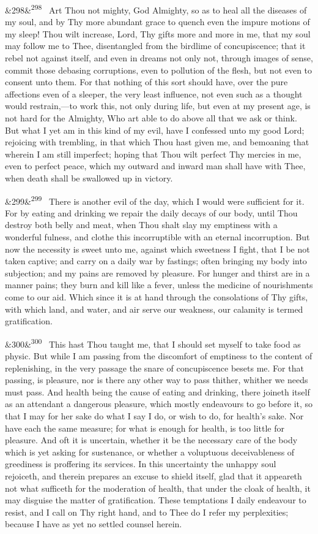 \documentclass[12pt]{article}
\newcommand{\para}[1][]{\par\noindent\ifx&#1&\else\textsuperscript{\footnotesize #1}~\fi}
\begin{document}
\para[298] Art Thou not mighty, God Almighty, so as to heal all the diseases of my soul, and by Thy more abundant grace to quench even the impure motions of my sleep! Thou wilt increase, Lord, Thy gifts more and more in me, that my soul may follow me to Thee, disentangled from the birdlime of concupiscence; that it rebel not against itself, and even in dreams not only not, through images of sense, commit those debasing corruptions, even to pollution of the flesh, but not even to consent unto them. For that nothing of this sort should have, over the pure affections even of a sleeper, the very least influence, not even such as a thought would restrain,---to work this, not only during life, but even at my present age, is not hard for the Almighty, Who art able to do above all that we ask or think. But what I yet am in this kind of my evil, have I confessed unto my good Lord; rejoicing with trembling, in that which Thou hast given me, and bemoaning that wherein I am still imperfect; hoping that Thou wilt perfect Thy mercies in me, even to perfect peace, which my outward and inward man shall have with Thee, when death shall be swallowed up in victory.

\para[299] There is another evil of the day, which I would were sufficient for it. For by eating and drinking we repair the daily decays of our body, until Thou destroy both belly and meat, when Thou shalt slay my emptiness with a wonderful fulness, and clothe this incorruptible with an eternal incorruption. But now the necessity is sweet unto me, against which sweetness I fight, that I be not taken captive; and carry on a daily war by fastings; often bringing my body into subjection; and my pains are removed by pleasure. For hunger and thirst are in a manner pains; they burn and kill like a fever, unless the medicine of nourishments come to our aid. Which since it is at hand through the consolations of Thy gifts, with which land, and water, and air serve our weakness, our calamity is termed gratification.

\para[300] This hast Thou taught me, that I should set myself to take food as physic. But while I am passing from the discomfort of emptiness to the content of replenishing, in the very passage the snare of concupiscence besets me. For that passing, is pleasure, nor is there any other way to pass thither, whither we needs must pass. And health being the cause of eating and drinking, there joineth itself as an attendant a dangerous pleasure, which mostly endeavours to go before it, so that I may for her sake do what I say I do, or wish to do, for health's sake. Nor have each the same measure; for what is enough for health, is too little for pleasure. And oft it is uncertain, whether it be the necessary care of the body which is yet asking for sustenance, or whether a voluptuous deceivableness of greediness is proffering its services. In this uncertainty the unhappy soul rejoiceth, and therein prepares an excuse to shield itself, glad that it appeareth not what sufficeth for the moderation of health, that under the cloak of health, it may disguise the matter of gratification. These temptations I daily endeavour to resist, and I call on Thy right hand, and to Thee do I refer my perplexities; because I have as yet no settled counsel herein.
\end{document}
